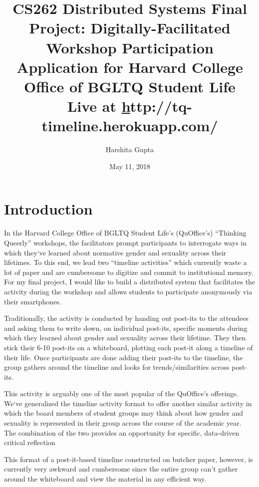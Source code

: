 \documentclass[12pt] {article}
\begin{document}
\title{CS262 Distributed Systems Final Project: Digitally-Facilitated Workshop Participation Application for Harvard College Office of BGLTQ Student Life\\ \large Live at \href{url}http://tq-timeline.herokuapp.com/}
\author{Harshita Gupta}
\date{May 11, 2018}
\maketitle
\thispagestyle{empty}
\bigskip
\pagebreak
\setcounter{page}{1}
\section{Introduction}

In the Harvard College Office of BGLTQ Student Life’s (QuOffice's) “Thinking Queerly” workshops, the facilitators prompt participants to interrogate ways in which they`ve learned about normative gender and sexuality across their lifetimes. To this end, we lead two ``timeline activities'' which currently waste a lot of paper and are cumbersome to digitize and commit to institutional memory. For my final project, I would like to build a distributed system that facilitates the activity during the workshop and allows students to participate anonymously via their smartphones. 

Traditionally, the activity is conducted by handing out post-its to the attendees and asking them to write down, on individual post-its, specific moments during which they learned about gender and sexuality across their lifetime. They then stick their 6-10 post-its on a whiteboard, plotting each post-it along a timeline of their life. Once participants are done adding their post-its to the timeline, the group gathers around the timeline and looks for trends/similarities across post-its. 

This activity is arguably one of the most popular of the QuOffice's offerings. We`ve generalized the timeline activity format to offer another similar activity in which the board members of student groups may think about how gender and sexuality is represented in their group across the course of the academic year. The combination of the two provides an opportunity for specific, data-driven critical reflection 

This format of a post-it-based timeline constructed on butcher paper, however, is currently very awkward and cumbersome since the entire group can’t gather around the whiteboard and view the material in any efficient way.
\end{document}
